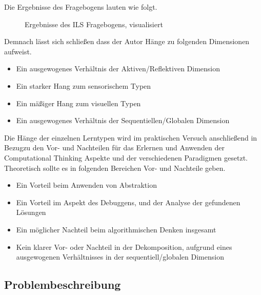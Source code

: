 Die Ergebnisse des Fragebogens lauten wie folgt.

\begin{figure}[h!]
    \centering
    
    \caption{Ergebnisse des ILS Fragebogens, visualisiert}
\end{figure}

Demnach lässt sich schließen dass der Autor Hänge zu folgenden Dimensionen aufweist.

\begin{itemize}
    \item Ein ausgewogenes Verhältnis der Aktiven/Reflektiven Dimension
    \item Ein starker Hang zum sensorischem Typen 
    \item Ein mäßiger Hang zum visuellen Typen
    \item Ein ausgewogenes Verhältnis der Sequentiellen/Globalen Dimension
\end{itemize}


Die Hänge der einzelnen Lerntypen wird im praktischen Versuch anschließend in Bezugzu den Vor- und Nachteilen für das Erlernen und Anwenden der Computational Thinking Aspekte und der verschiedenen Paradigmen gesetzt.
Theoretisch sollte es in folgenden Bereichen Vor- und Nachteile geben.

\begin{itemize}
    \item Ein Vorteil beim Anwenden von Abstraktion
    \item Ein Vorteil im Aspekt des Debuggens, und der Analyse der gefundenen Lösungen
    \item Ein möglicher Nachteil beim algorithmischen Denken insgesamt
    \item Kein klarer Vor- oder Nachteil in der Dekomposition, aufgrund eines ausgewogenen Verhältnisses in der sequentiell/globalen Dimension
\end{itemize}

\subsection{Problembeschreibung}
